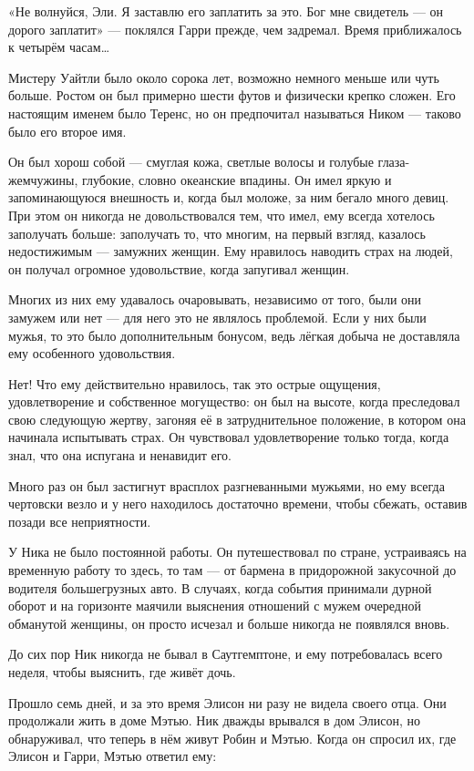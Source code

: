 \documentclass[a5paper, 9pt,
final, openany, twoside=true]{memoir}
\begin{document}
«Не волнуйся, Эли. Я заставлю его заплатить за это. Бог мне свидетель — он дорого заплатит» — поклялся Гарри прежде, чем задремал. Время приближалось к четырём часам…\bigskip

Мистеру Уайтли было около сорока лет, возможно немного меньше или чуть больше. Ростом он был примерно шести футов и физически крепко сложен. Его настоящим именем было Теренс, но он предпочитал называться Ником — таково было его второе имя.

Он был хорош собой — смуглая кожа, светлые волосы и голубые глаза-жемчужины, глубокие, словно океанские впадины. Он имел яркую и запоминающуюся внешность и, когда был моложе, за ним бегало много девиц. При этом он никогда не довольствовался тем, что имел, ему всегда хотелось заполучать больше: заполучать  то, что многим, на первый взгляд, казалось недостижимым — замужних женщин. Ему нравилось наводить страх на людей, он получал огромное удовольствие, когда запугивал женщин.

Многих из них ему удавалось очаровывать, независимо от того, были они замужем или нет — для него это не являлось проблемой. Если у них были мужья, то это было дополнительным бонусом, ведь лёгкая добыча не доставляла ему особенного удовольствия.

Нет! Что ему действительно нравилось, так это острые ощущения, удовлетворение и собственное могущество: он был на высоте, когда преследовал свою следующую жертву, загоняя её в затруднительное положение, в котором она начинала испытывать страх. Он чувствовал удовлетворение только тогда, когда знал, что она испугана и ненавидит его.

Много раз он был застигнут врасплох разгневанными мужьями, но ему всегда чертовски везло и у него находилось достаточно времени, чтобы сбежать, оставив позади все неприятности.

У Ника не было постоянной работы. Он путешествовал по стране, устраиваясь на временную работу то здесь, то там — от бармена в придорожной закусочной до водителя большегрузных авто. В случаях, когда события принимали дурной оборот и на горизонте маячили выяснения отношений с мужем очередной обманутой женщины, он просто исчезал и больше никогда не появлялся вновь.

До сих пор Ник никогда не бывал в Саутгемптоне, и ему потребовалась всего неделя, чтобы выяснить, где живёт дочь.\bigskip

Прошло семь дней, и за это время Элисон ни разу не видела своего отца. Они продолжали жить в доме Мэтью. Ник дважды врывался в дом Элисон, но обнаруживал, что теперь в нём живут Робин и Мэтью. Когда он спросил их, где Элисон и Гарри, Мэтью ответил ему:
\end{document}
